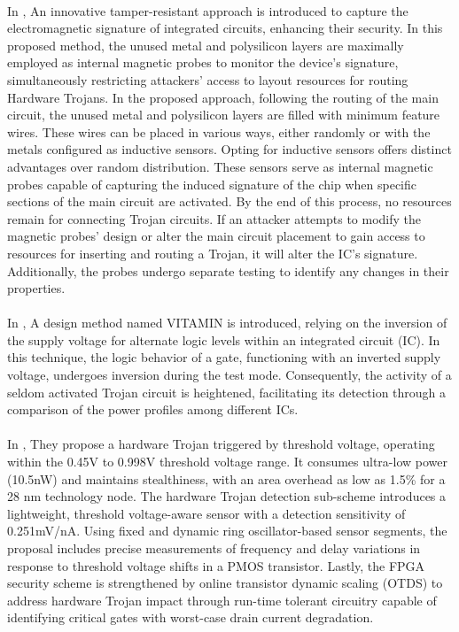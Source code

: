 \paragraph*{}
In \cite{9130873}, An innovative tamper-resistant approach is introduced to capture the electromagnetic signature of integrated circuits, enhancing their security. In this proposed method, the unused metal and polysilicon layers are maximally employed as internal magnetic probes to monitor the device's signature, simultaneously restricting attackers' access to layout resources for routing Hardware Trojans. In the proposed approach, following the routing of the main circuit, the unused metal and polysilicon layers are filled with minimum feature wires. These wires can be placed in various ways, either randomly or with the metals configured as inductive sensors. Opting for inductive sensors offers distinct advantages over random distribution. These sensors serve as internal magnetic probes capable of capturing the induced signature of the chip when specific sections of the main circuit are activated. By the end of this process, no resources remain for connecting Trojan circuits. If an attacker attempts to modify the magnetic probes' design or alter the main circuit placement to gain access to resources for inserting and routing a Trojan, it will alter the IC's signature. Additionally, the probes undergo separate testing to identify any changes in their properties.
\paragraph*{}
In \cite{5224960}, A design method named VITAMIN is introduced, relying on the inversion of the supply voltage for alternate logic levels within an integrated circuit (IC). In this technique, the logic behavior of a gate, functioning with an inverted supply voltage, undergoes inversion during the test mode. Consequently, the activity of a seldom activated Trojan circuit is heightened, facilitating its detection through a comparison of the power profiles among different ICs.
\paragraph*{}
In \cite{8993719}, They propose a hardware Trojan triggered by threshold voltage, operating within the 0.45V to 0.998V threshold voltage range. It consumes ultra-low power (10.5nW) and maintains stealthiness, with an area overhead as low as 1.5\% for a 28 nm technology node. The hardware Trojan detection sub-scheme introduces a lightweight, threshold voltage-aware sensor with a detection sensitivity of 0.251mV/nA. Using fixed and dynamic ring oscillator-based sensor segments, the proposal includes precise measurements of frequency and delay variations in response to threshold voltage shifts in a PMOS transistor. Lastly, the FPGA security scheme is strengthened by online transistor dynamic scaling (OTDS) to address hardware Trojan impact through run-time tolerant circuitry capable of identifying critical gates with worst-case drain current degradation.
